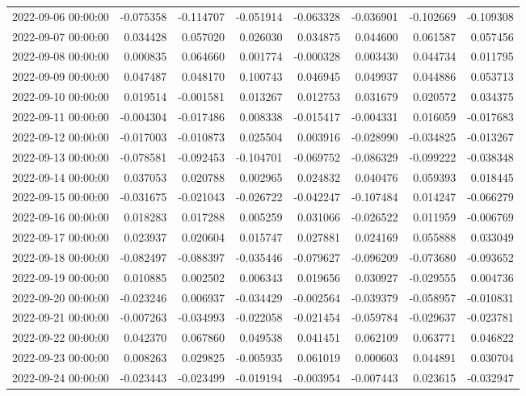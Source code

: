 \begin{tabular}{lrrrrrrr}
2022-09-06 00:00:00 & -0.075358 & -0.114707 & -0.051914 & -0.063328 & -0.036901 & -0.102669 & -0.109308 \\
2022-09-07 00:00:00 & 0.034428 & 0.057020 & 0.026030 & 0.034875 & 0.044600 & 0.061587 & 0.057456 \\
2022-09-08 00:00:00 & 0.000835 & 0.064660 & 0.001774 & -0.000328 & 0.003430 & 0.044734 & 0.011795 \\
2022-09-09 00:00:00 & 0.047487 & 0.048170 & 0.100743 & 0.046945 & 0.049937 & 0.044886 & 0.053713 \\
2022-09-10 00:00:00 & 0.019514 & -0.001581 & 0.013267 & 0.012753 & 0.031679 & 0.020572 & 0.034375 \\
2022-09-11 00:00:00 & -0.004304 & -0.017486 & 0.008338 & -0.015417 & -0.004331 & 0.016059 & -0.017683 \\
2022-09-12 00:00:00 & -0.017003 & -0.010873 & 0.025504 & 0.003916 & -0.028990 & -0.034825 & -0.013267 \\
2022-09-13 00:00:00 & -0.078581 & -0.092453 & -0.104701 & -0.069752 & -0.086329 & -0.099222 & -0.038348 \\
2022-09-14 00:00:00 & 0.037053 & 0.020788 & 0.002965 & 0.024832 & 0.040476 & 0.059393 & 0.018445 \\
2022-09-15 00:00:00 & -0.031675 & -0.021043 & -0.026722 & -0.042247 & -0.107484 & 0.014247 & -0.066279 \\
2022-09-16 00:00:00 & 0.018283 & 0.017288 & 0.005259 & 0.031066 & -0.026522 & 0.011959 & -0.006769 \\
2022-09-17 00:00:00 & 0.023937 & 0.020604 & 0.015747 & 0.027881 & 0.024169 & 0.055888 & 0.033049 \\
2022-09-18 00:00:00 & -0.082497 & -0.088397 & -0.035446 & -0.079627 & -0.096209 & -0.073680 & -0.093652 \\
2022-09-19 00:00:00 & 0.010885 & 0.002502 & 0.006343 & 0.019656 & 0.030927 & -0.029555 & 0.004736 \\
2022-09-20 00:00:00 & -0.023246 & 0.006937 & -0.034429 & -0.002564 & -0.039379 & -0.058957 & -0.010831 \\
2022-09-21 00:00:00 & -0.007263 & -0.034993 & -0.022058 & -0.021454 & -0.059784 & -0.029637 & -0.023781 \\
2022-09-22 00:00:00 & 0.042370 & 0.067860 & 0.049538 & 0.041451 & 0.062109 & 0.063771 & 0.046822 \\
2022-09-23 00:00:00 & 0.008263 & 0.029825 & -0.005935 & 0.061019 & 0.000603 & 0.044891 & 0.030704 \\
2022-09-24 00:00:00 & -0.023443 & -0.023499 & -0.019194 & -0.003954 & -0.007443 & 0.023615 & -0.032947 \\

\end{tabular}
